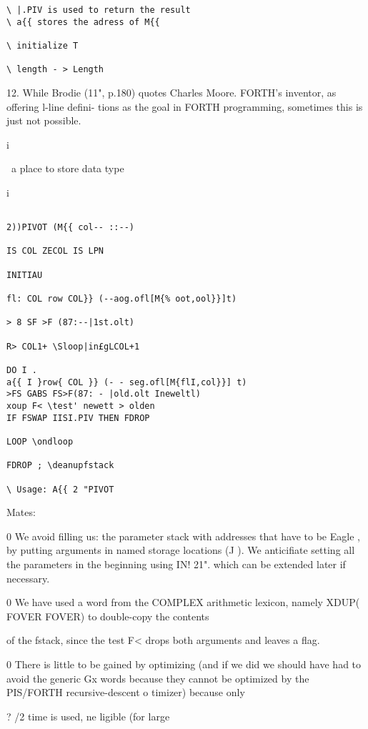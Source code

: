 {{{{{{{{{{\begin{verbatim}
\ |.PIV is used to return the result
\ a{{ stores the adress of M{{

\ initialize T

\ length - > Length

\end{verbatim} 

12. While Brodie (11", p.180) quotes Charles Moore. FORTH's inventor, as offering l-line defini-
tions as the goal in FORTH programming, sometimes this is just not possible.

i

\ a place to store data type

i

 



\begin{verbatim}

2))PIVOT (M{{ col-- ::--)

IS COL ZECOL IS LPN

INITIAU

fl: COL row COL}} (--aog.ofl[M{% oot,ool}}]t)

> 8 SF >F (87:--|1st.olt)

R> COL1+ \Sloop|in£gLCOL+1

DO I .
a{{ I }row{ COL }} (- - seg.ofl[M{flI,col}}] t)
>FS GABS FS>F(87: - |old.olt Ineweltl)
xoup F< \test' newett > olden
IF FSWAP IISI.PIV THEN FDROP

LOOP \ondloop

FDROP ; \deanupfstack

\ Usage: A{{ 2 "PIVOT
\end{verbatim}

Mates:

0 We avoid filling us: the parameter stack with addresses that
have to be Eagle , by putting arguments in named storage
locations (J ). We anticifiate setting all the parameters in
the beginning using IN! 21". which can be extended later
if necessary.

0 We have used a word from the COMPLEX arithmetic lexicon,
namely XDUP( FOVER FOVER) to double-copy the contents

of the fstack, since the test F< drops both arguments and
leaves a flag.

0 There is little to be gained by optimizing (and if we did we
should have had to avoid the generic Gx words because they
cannot be optimized by the PIS/FORTH recursive-descent
o timizer) because only}? /2 time is used, ne ligible (for large

}}}}}}}}}
